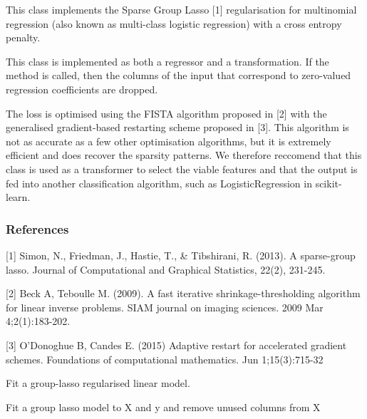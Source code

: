 \documentclass[letterpaper,10pt,english]{sphinxmanual}
\begin{document}
{\begin{fulllineitems}
This class implements the Sparse Group Lasso {[}1{]} regularisation for
multinomial regression (also known as multi-class logistic regression)
with a cross entropy penalty.

This class is implemented as both a regressor and a transformation.
If the  method is called, then the columns of the input
that correspond to zero-valued regression coefficients are dropped.

The loss is optimised using the FISTA algorithm proposed in {[}2{]} with the
generalised gradient-based restarting scheme proposed in {[}3{]}. This
algorithm is not as accurate as a few other optimisation algorithms,
but it is extremely efficient and does recover the sparsity patterns.
We therefore reccomend that this class is used as a transformer to select
the viable features and that the output is fed into another classification
algorithm, such as LogisticRegression in scikit-learn.
\subsubsection*{References}

{[}1{]} Simon, N., Friedman, J., Hastie, T., \& Tibshirani, R. (2013).
A sparse-group lasso. Journal of Computational and Graphical
Statistics, 22(2), 231-245.

{[}2{]} Beck A, Teboulle M. (2009). A fast iterative shrinkage-thresholding
algorithm for linear inverse problems. SIAM journal on imaging
sciences. 2009 Mar 4;2(1):183-202.

{[}3{]} O’Donoghue B, Candes E. (2015) Adaptive restart for accelerated
gradient schemes. Foundations of computational mathematics.
Jun 1;15(3):715-32

\begin{fulllineitems}
\label{\detokenize{api_reference:group_lasso.MultinomialGroupLasso.fit}}
Fit a group-lasso regularised linear model.

\end{fulllineitems}


\begin{fulllineitems}
\label{\detokenize{api_reference:group_lasso.MultinomialGroupLasso.fit_transform}}
Fit a group lasso model to X and y and remove unused columns from X


\end{fulllineitems}
\end{fulllineitems}}
\end{document}
